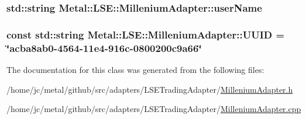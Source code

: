 \subsubsection[{user\+Name}]{\setlength{\rightskip}{0pt plus 5cm}std\+::string Metal\+::\+L\+S\+E\+::\+Millenium\+Adapter\+::user\+Name\hspace{0.3cm}{\ttfamily [protected]}}\label{classMetal_1_1LSE_1_1MilleniumAdapter_a1c12122da30ec79f3907a82ac1847c33}
\hypertarget{classMetal_1_1LSE_1_1MilleniumAdapter_a5d93beb732517c12013a007611377341}{}
\subsubsection[{U\+U\+I\+D}]{\setlength{\rightskip}{0pt plus 5cm}const std\+::string Metal\+::\+L\+S\+E\+::\+Millenium\+Adapter\+::\+U\+U\+I\+D = \char`\"{}acba8ab0-\/4564-\/11e4-\/916c-\/0800200c9a66\char`\"{}\hspace{0.3cm}{\ttfamily [static]}}\label{classMetal_1_1LSE_1_1MilleniumAdapter_a5d93beb732517c12013a007611377341}


The documentation for this class was generated from the following files\+:\begin{DoxyCompactItemize}
\item 
/home/jc/metal/github/src/adapters/\+L\+S\+E\+Trading\+Adapter/\hyperlink{MilleniumAdapter_8h}{Millenium\+Adapter.\+h}\item 
/home/jc/metal/github/src/adapters/\+L\+S\+E\+Trading\+Adapter/\hyperlink{MilleniumAdapter_8cpp}{Millenium\+Adapter.\+cpp}\end{DoxyCompactItemize}
